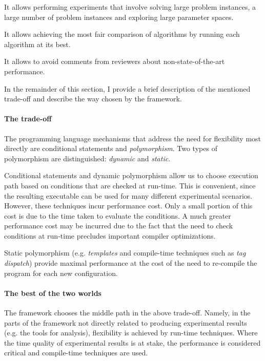 \begin{DoxyItemize}
\item It allows performing experiments that involve solving large problem instances, a large number of problem instances and exploring large parameter spaces.
\item It allows achieving the most fair comparison of algorithms by running each algorithm at its best.
\item It allows to avoid comments from reviewers about non-\/state-\/of-\/the-\/art performance.
\end{DoxyItemize}

In the remainder of this section, I provide a brief description of the mentioned trade-\/off and describe the way chosen by the framework.\hypertarget{index_s-tradeoff}{}\paragraph{The trade-\/off}\label{index_s-tradeoff}
The programming language mechanisms that address the need for flexibility most directly are conditional statements and {\itshape polymorphism}. Two types of polymorphism are distinguished\+: {\itshape dynamic} and {\itshape static}.

Conditional statements and dynamic polymorphism allow us to choose execution path based on conditions that are checked at run-\/time. This is convenient, since the resulting executable can be used for many different experimental scenarios. However, these techniques incur performance cost. Only a small portion of this cost is due to the time taken to evaluate the conditions. A much greater performance cost may be incurred due to the fact that the need to check conditions at run-\/time precludes important compiler optimizations.

Static polymorphism (e.\+g. {\itshape templates} and compile-\/time techniques such as {\itshape tag dispatch}) provide maximal performance at the cost of the need to re-\/compile the program for each new configuration.\hypertarget{index_s-configuration}{}\paragraph{The best of the two worlds}\label{index_s-configuration}
The framework chooses the middle path in the above trade-\/off. Namely, in the parts of the framework not directly related to producing experimental results (e.\+g. the tools for analysis), flexibility is achieved by run-\/time techniques. Where the time quality of experimental results is at stake, the performance is considered critical and compile-\/time techniques are used.

